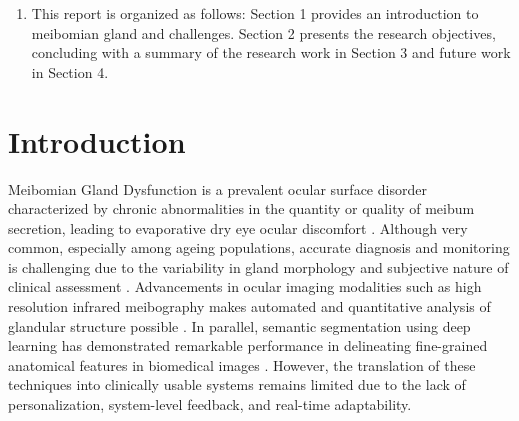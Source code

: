\documentclass{article}
\begin{document}
\begin{enumerate}
\begin{itemize}
    \item M. Irfan, N. K. Suryadevara and R. S. Singh, \textbf{Comparative Analysis of Computer Vision and IMU Sensing Systems for Accurate Determination of Gait Parameters,} 2024 17th International Conference on Sensing Technology (ICST), Sydney, Australia, 2024, pp. 1-6, doi: 10.1109/ICST62759.2024.10992235.

    \item M. Kumari, R. S. Singh, N. K. Suryadevara and S. C. Mukhopadhyay, \textbf{A Learning Model for Hyderabad AQI based on Social Behaviour,} 2024 17th International Conference on Sensing Technology (ICST), Sydney, Australia, 2024, pp. 1-6, doi: 10.1109/ICST62759. 2024.10992226.
    
    \end{itemize}

    \item This report is organized as follows: Section 1 provides an introduction to meibomian gland and challenges. Section 2 presents the research objectives, concluding with a summary of the research work in Section 3 and future work in Section 4. 
    
\end{enumerate}
\newpage

\section{Introduction}

Meibomian Gland Dysfunction is a prevalent ocular surface disorder characterized by chronic abnormalities in the quantity or quality of meibum secretion, leading to evaporative dry eye ocular discomfort \cite{meiboworkshop}. Although very common, especially among ageing populations, accurate diagnosis and monitoring is challenging due to the variability in gland morphology and subjective nature of clinical assessment \cite{blackie2013symptoms}. Advancements in ocular imaging modalities such as high resolution infrared meibography makes automated and quantitative analysis of glandular structure possible \cite{arita2008meibography}. In parallel, semantic segmentation using deep learning has demonstrated remarkable performance in delineating fine-grained anatomical features in biomedical images \cite{ronneberger2015unet}. However, the translation of these techniques into clinically usable systems remains limited due to the lack of personalization, system-level feedback, and real-time adaptability.
\end{document}

